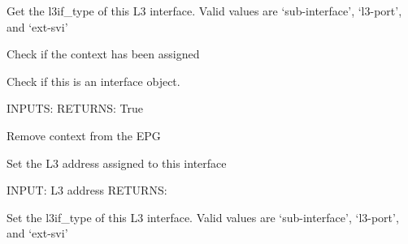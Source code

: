 \documentclass[letterpaper,10pt,english]{sphinxmanual}
\begin{document}
\begin{fulllineitems}
\begin{fulllineitems}
\label{acitoolkit:acitoolkit.L3Interface.get_l3if_type}
Get the l3if\_type of this L3 interface.
Valid values are `sub-interface', `l3-port', and `ext-svi'

\end{fulllineitems}


\begin{fulllineitems}
\label{acitoolkit:acitoolkit.L3Interface.has_context}
Check if the context has been assigned

\end{fulllineitems}


\begin{fulllineitems}
\label{acitoolkit:acitoolkit.L3Interface.is_interface}
Check if this is an interface object.

INPUTS:
RETURNS: True

\end{fulllineitems}


\begin{fulllineitems}
\label{acitoolkit:acitoolkit.L3Interface.remove_context}
Remove context from the EPG

\end{fulllineitems}


\begin{fulllineitems}
\label{acitoolkit:acitoolkit.L3Interface.set_addr}
Set the L3 address assigned to this interface

INPUT: L3 address
RETURNS:

\end{fulllineitems}


\begin{fulllineitems}
\label{acitoolkit:acitoolkit.L3Interface.set_l3if_type}
Set the l3if\_type of this L3 interface.
Valid values are `sub-interface', `l3-port', and `ext-svi'

\end{fulllineitems}


\end{fulllineitems}
\end{document}
